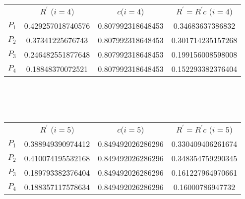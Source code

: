 \documentclass[paper=8.27in:11.69in, 14pt, DIV=calc]{scrartcl}
\begin{document}
\\
\\
\\
\begin{tabular}{cccc}
   & $R^{'}$ ($i=4$)          & $c$($i=4$)           & $R^{'} = R^{'}c$ ($i=4$)      \\
$P_{1}$ & 0.429257018740576 & 0.807992318648453 & 0.34683637386832  \\
$P_{2}$ & 0.37341225676743  & 0.807992318648453 & 0.301714235157268 \\
$P_{3}$ & 0.246482551877648 & 0.807992318648453 & 0.199156008598008 \\
$P_{4}$ & 0.18848370072521  & 0.807992318648453 & 0.152293382376404
\end{tabular}
\\
\\
\\
\begin{tabular}{cccc}
   & $R^{'}$ ($i=5$)          & $c$($i=5$)           & $R^{'} = R^{'}c$ ($i=5$)      \\
$P_{1}$ & 0.388949390974412 & 0.849492026286296 & 0.330409406261674 \\
$P_{2}$ & 0.410074195532168 & 0.849492026286296 & 0.348354759290345 \\
$P_{3}$ & 0.189793382376404 & 0.849492026286296 & 0.161227964970661 \\
$P_{4}$ & 0.188357117578634 & 0.849492026286296 & 0.16000786947732 
\end{tabular}
\end{document}
